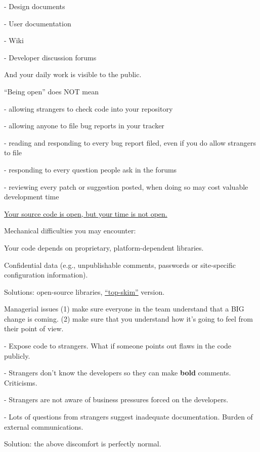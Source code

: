 \documentclass[landscape,30pt]{foils}
\begin{document}
- Design documents

- User documentation

- Wiki

- Developer discussion forums

And your daily work is visible to the public.

\newpage
``Being open'' does NOT mean

- allowing strangers to check code into your repository

- allowing anyone to file bug reports in your tracker

- reading and responding to every bug report filed, even if you do allow strangers to file

- responding to every question people ask in the forums

- reviewing every patch or suggestion posted, when doing so may cost valuable development time

\underline{Your source code is open, but your time is not open.}


Mechanical difficulties you may encounter:

Your code depends on proprietary, platform-dependent libraries. 

Confidential data (e.g., unpublishable comments, passwords or
site-specific configuration information).

Solutions: open-source libraries, \underline{``top-skim''} version.

Managerial issues (1) make sure everyone in the team understand that a BIG change is coming. (2) make sure that you understand how it's going to feel from their point of view.

- Expose code to strangers.  What if someone points out flaws in the code publicly.

- Strangers don't know the developers so they can make {\bf bold} comments. Criticisms.

- Strangers are not aware of business pressures forced on the developers.

- Lots of questions from strangers suggest inadequate documentation.  Burden of external communications.

Solution: the above discomfort is perfectly normal.

\end{document}
